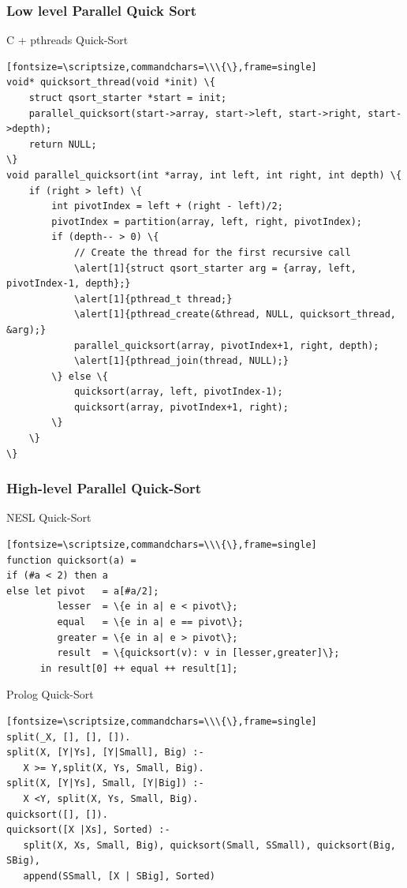 \documentclass{beamer}
\let\oldalert\alert
\renewcommand{\alert}[2][]{%
  \if\relax\detokenize{#1}\relax%
    \oldalert{#2}%
  \else
    \oldalert<#1>{#2}%
  \fi}
\begin{document}
\begin{frame}[fragile]
   \frametitle{Low level Parallel Quick Sort}
   \begin{block}{C + pthreads Quick-Sort}
      \begin{verbatim}[fontsize=\scriptsize,commandchars=\\\{\},frame=single]
void* quicksort_thread(void *init) \{
    struct qsort_starter *start = init;
    parallel_quicksort(start->array, start->left, start->right, start->depth);
    return NULL;
\}
void parallel_quicksort(int *array, int left, int right, int depth) \{
    if (right > left) \{
        int pivotIndex = left + (right - left)/2;
        pivotIndex = partition(array, left, right, pivotIndex);
        if (depth-- > 0) \{
            // Create the thread for the first recursive call
            \alert[1]{struct qsort_starter arg = {array, left, pivotIndex-1, depth};}
            \alert[1]{pthread_t thread;}
            \alert[1]{pthread_create(&thread, NULL, quicksort_thread, &arg);}
            parallel_quicksort(array, pivotIndex+1, right, depth);
            \alert[1]{pthread_join(thread, NULL);}
        \} else \{
            quicksort(array, left, pivotIndex-1);
            quicksort(array, pivotIndex+1, right);
        \}
    \}
\}
       \end{verbatim}
   \end{block}
\end{frame}

\begin{frame}[fragile]
   \frametitle{High-level Parallel Quick-Sort}
   \begin{block}{NESL Quick-Sort}
      \begin{verbatim}[fontsize=\scriptsize,commandchars=\\\{\},frame=single]
function quicksort(a) =
if (#a < 2) then a
else let pivot   = a[#a/2];
         lesser  = \{e in a| e < pivot\};
         equal   = \{e in a| e == pivot\};
         greater = \{e in a| e > pivot\};
         result  = \{quicksort(v): v in [lesser,greater]\};
      in result[0] ++ equal ++ result[1];
      \end{verbatim}
   \end{block}
   \begin{block}{Prolog Quick-Sort}
      \begin{verbatim}[fontsize=\scriptsize,commandchars=\\\{\},frame=single]
split(_X, [], [], []).
split(X, [Y|Ys], [Y|Small], Big) :-
   X >= Y,split(X, Ys, Small, Big).
split(X, [Y|Ys], Small, [Y|Big]) :-
   X <Y, split(X, Ys, Small, Big).
quicksort([], []).
quicksort([X |Xs], Sorted) :-
   split(X, Xs, Small, Big), quicksort(Small, SSmall), quicksort(Big, SBig),
   append(SSmall, [X | SBig], Sorted)
      \end{verbatim}
   \end{block}
\end{frame}
\end{document}
